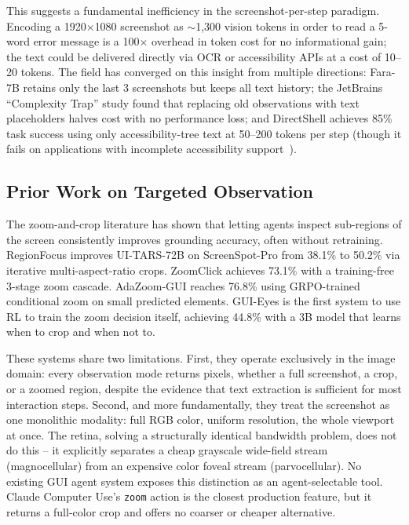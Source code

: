 \documentclass[11pt,a4paper]{article}
\begin{document}
This suggests a fundamental inefficiency in the screenshot-per-step paradigm.
Encoding a 1920$\times$1080 screenshot as $\sim$1{,}300 vision tokens in order to read a 5-word error message is a 100$\times$ overhead in token cost for no informational gain; the text could be delivered directly via OCR or accessibility APIs at a cost of 10--20 tokens.
The field has converged on this insight from multiple directions: Fara-7B \cite{fara-7b} retains only the last 3 screenshots but keeps all text history; the JetBrains ``Complexity Trap'' study \cite{jetbrains-complexity-trap} found that replacing old observations with text placeholders halves cost with no performance loss; and DirectShell \cite{directshell} achieves 85\% task success using only accessibility-tree text at 50--200 tokens per step (though it fails on applications with incomplete accessibility support~\cite{screen2ax}).

\subsection{Prior Work on Targeted Observation}
\label{sec:intro-prior-work}

The zoom-and-crop literature has shown that letting agents inspect sub-regions of the screen consistently improves grounding accuracy, often without retraining.
RegionFocus \cite{regionfocus} improves UI-TARS-72B on ScreenSpot-Pro from 38.1\% to 50.2\% via iterative multi-aspect-ratio crops.
ZoomClick \cite{zoomclick} achieves 73.1\% with a training-free 3-stage zoom cascade.
AdaZoom-GUI \cite{adazoom-gui} reaches 76.8\% using GRPO-trained conditional zoom on small predicted elements.
GUI-Eyes \cite{gui-eyes} is the first system to use RL to train the zoom decision itself, achieving 44.8\% with a 3B model that learns when to crop and when not to.

These systems share two limitations.
First, they operate exclusively in the image domain: every observation mode returns pixels, whether a full screenshot, a crop, or a zoomed region, despite the evidence that text extraction is sufficient for most interaction steps.
Second, and more fundamentally, they treat the screenshot as one monolithic modality: full RGB color, uniform resolution, the whole viewport at once.
The retina, solving a structurally identical bandwidth problem, does not do this -- it explicitly separates a cheap grayscale wide-field stream (magnocellular) from an expensive color foveal stream (parvocellular).
No existing GUI agent system exposes this distinction as an agent-selectable tool.
Claude Computer Use's \texttt{zoom} action \cite{claude-computer-use} is the closest production feature, but it returns a full-color crop and offers no coarser or cheaper alternative.
\end{document}
